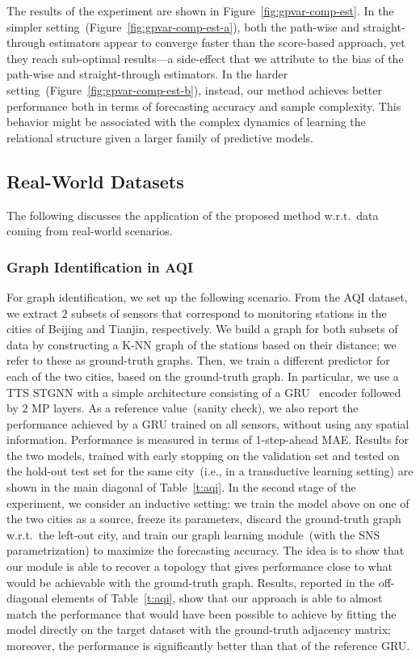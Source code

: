 The results of the experiment are shown in Figure~\ref{fig:gpvar-comp-est}. In the simpler setting~(Figure~\ref{fig:gpvar-comp-est-a}), both the path-wise and straight-through estimators appear to converge faster than the score-based approach, yet they reach sub-optimal results---a side-effect that we attribute to the bias of the path-wise and straight-through estimators.
In the harder setting~(Figure~\ref{fig:gpvar-comp-est-b}), instead, our method achieves better performance both in terms of forecasting accuracy and sample complexity. This behavior might be associated with the complex dynamics of learning the relational structure given a larger family of predictive models. 

\subsection{Real-World Datasets}

The following discusses the application of the proposed method w.r.t.\ data coming from real-world scenarios.

\subsubsection{Graph Identification in AQI}
For graph identification, we set up the following scenario. From the AQI dataset, we extract $2$ subsets of sensors that correspond to monitoring stations in the cities of Beijing and Tianjin, respectively. We build a graph for both subsets of data by constructing a K-NN graph of the stations based on their distance; we refer to these as ground-truth graphs. Then, we train a different predictor for each of the two cities, based on the ground-truth graph. In particular, we use a TTS STGNN with a simple architecture consisting of a GRU~\citep{chung2014empirical} encoder followed by $2$ MP layers. As a reference value~(sanity check), we also report the performance achieved by a GRU trained on all sensors, without using any spatial information. Performance is measured in terms of 1-step-ahead MAE. 
%
Results for the two models, trained with early stopping on the validation set and tested on the hold-out test set for the same city~(i.e., in a transductive learning setting) are shown in the main diagonal of Table~\ref{t:aqi}. %
In the second stage of the experiment, we consider an inductive setting:  we train the model above on one of the two cities as a source, freeze its parameters, discard the ground-truth graph w.r.t.\ the left-out city, and train our graph learning module~(with the SNS parametrization) to maximize the forecasting accuracy. The idea is to show that our module is able to recover a topology that gives performance close to what would be achievable with the ground-truth graph.  Results, reported in the off-diagonal elements of Table~\ref{t:aqi}, show that our approach is able to almost match the performance that would have been possible to achieve by fitting the model directly on the target dataset with the ground-truth adjacency matrix; moreover, the performance is significantly better than that of the reference GRU.

